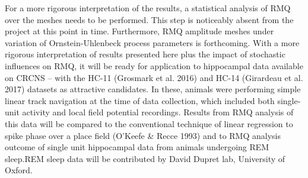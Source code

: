 \documentclass[12pt, letterpaper]{article}
\newenvironment{collapsable}{}{}
\begin{document}
\begin{collapsable}
  \vspace{12pt}

  For a more rigorous interpretation of the results, a statistical analysis of
  RMQ over the meshes needs to be performed. This step is noticeably absent
  from the project at this point in time. Furthermore, RMQ amplitude meshes
  under variation of Ornstein-Uhlenbeck process parameters is forthcoming.
  With a more rigorous interpretation of results presented here plus the impact
  of stochastic influences on RMQ, it will be ready for application to
  hippocampal data available on CRCNS -- with the HC-11 (Grosmark et al. 2016)
  and HC-14 (Girardeau et al. 2017) datasets as attractive candidates. In these,
  animals were performing simple linear track navigation at the time of data
  collection, which included both single-unit activity and local field potential
  recordings. Results from RMQ analysis of this data will be compared to the
  conventional technique of linear regression to spike phase over a place field
  (O'Keefe \& Recce 1993) and to RMQ analysis outcome of single unit hippocampal
  data from animals undergoing REM sleep.REM sleep data will be contributed by
  David Dupret lab, University of Oxford.
\end{collapsable}
\end{document}
